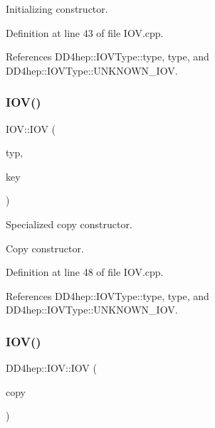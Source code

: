 Initializing constructor. 



Definition at line 43 of file I\+O\+V.\+cpp.



References D\+D4hep\+::\+I\+O\+V\+Type\+::type, type, and D\+D4hep\+::\+I\+O\+V\+Type\+::\+U\+N\+K\+N\+O\+W\+N\+\_\+\+I\+OV.

\hypertarget{class_d_d4hep_1_1_i_o_v_a1744cedccf7a479d152c842f7fc5220a}{}\label{class_d_d4hep_1_1_i_o_v_a1744cedccf7a479d152c842f7fc5220a} 
\subsubsection{\texorpdfstring{I\+O\+V()}{IOV()}\hspace{0.1cm}{\footnotesize\ttfamily [3/4]}}
{\footnotesize\ttfamily I\+O\+V\+::\+I\+OV (\begin{DoxyParamCaption}\item[{const \hyperlink{class_d_d4hep_1_1_i_o_v_type}{I\+O\+V\+Type} $\ast$}]{typ,  }\item[{const \hyperlink{class_d_d4hep_1_1_i_o_v_a07cb46dc875296dc9cccf4ff370104ae}{Key} \&}]{key }\end{DoxyParamCaption})\hspace{0.3cm}{\ttfamily [explicit]}}



Specialized copy constructor. 

Copy constructor. 

Definition at line 48 of file I\+O\+V.\+cpp.



References D\+D4hep\+::\+I\+O\+V\+Type\+::type, type, and D\+D4hep\+::\+I\+O\+V\+Type\+::\+U\+N\+K\+N\+O\+W\+N\+\_\+\+I\+OV.

\hypertarget{class_d_d4hep_1_1_i_o_v_ac90079056c51c0ae5e7f88bc4050b31d}{}\label{class_d_d4hep_1_1_i_o_v_ac90079056c51c0ae5e7f88bc4050b31d} 
\subsubsection{\texorpdfstring{I\+O\+V()}{IOV()}\hspace{0.1cm}{\footnotesize\ttfamily [4/4]}}
{\footnotesize\ttfamily D\+D4hep\+::\+I\+O\+V\+::\+I\+OV (\begin{DoxyParamCaption}\item[{const \hyperlink{class_d_d4hep_1_1_i_o_v}{I\+OV} \&}]{copy }\end{DoxyParamCaption})\hspace{0.3cm}{\ttfamily [default]}}



